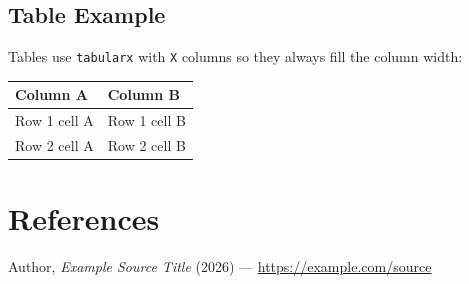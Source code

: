 \subsection*{Table Example}

Tables use \texttt{tabularx} with \texttt{X} columns so they always fill
the column width:

\begin{table}[!htbp]
\centering\footnotesize
\begin{tabularx}{\linewidth}{@{}XX@{}}
\toprule
\textbf{Column A} & \textbf{Column B} \\
\midrule
Row 1 cell A & Row 1 cell B \\
Row 2 cell A & Row 2 cell B \\
\bottomrule
\end{tabularx}
\end{table}

\clearpage
\section*{References}
\footnotesize
\sloppy

\begin{enumerate}[label={[\arabic*]},leftmargin=1.6em,itemsep=0.5em]
  \item Author, \textit{Example Source Title} (2026) — \url{https://example.com/source}
\end{enumerate}


